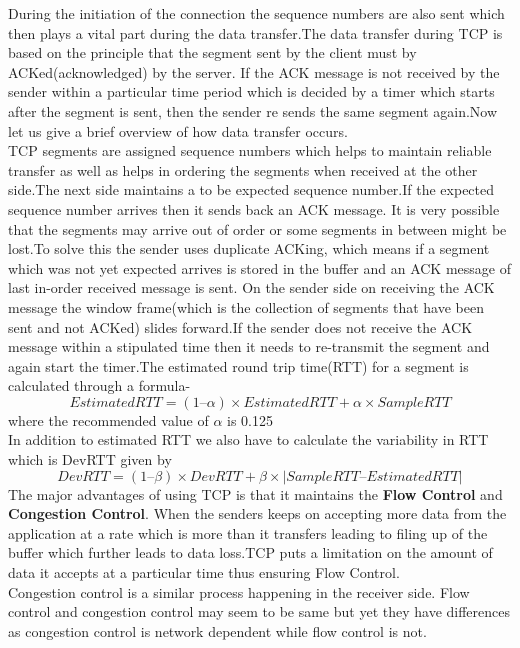 \documentclass{article}
\begin{document}
During the initiation of the connection the sequence numbers are also sent which then plays a vital part during the data transfer.The data transfer during TCP is based on the principle that the segment sent by the client must by ACKed(acknowledged) by the server. If the ACK message is not received by the sender within a particular time period which is decided by a timer which starts after the segment is sent, then the sender re sends the same segment again.Now let us give a brief overview of how data transfer occurs.\\
TCP segments are assigned sequence numbers which helps to maintain reliable transfer as well as helps in ordering the segments when received at the other side.The next side maintains a to be expected sequence number.If the expected sequence number arrives then it sends back an ACK message. It is very possible that the segments may arrive out of order or some segments in between might be lost.To solve this the sender uses duplicate ACKing, which means if a segment which was not yet expected arrives is stored in the buffer and an ACK message of last in-order received message is sent. On the sender side on receiving the ACK message the window frame(which is the collection of segments that have been sent and not ACKed) slides forward.If the sender does not receive the ACK message within a stipulated time then it needs to re-transmit the segment and again start the timer.The estimated round trip time(RTT) for a segment is calculated through a formula-
\[
    EstimatedRTT = (1 – \alpha) \times EstimatedRTT + \alpha \times SampleRTT
\]
where the recommended value of  $\alpha$ is 0.125\\
In addition to estimated RTT we also  have to calculate the variability in RTT which is DevRTT given by
\[
DevRTT = (1 – \beta) \times DevRTT + \beta \times | SampleRTT – EstimatedRTT |
\]
The major advantages of using TCP is that it maintains the \textbf{Flow Control} and \textbf{Congestion Control}. When the senders keeps on accepting more data from the application at a rate which is more than it transfers leading to filing up of the buffer which further leads to data loss.TCP puts a limitation on the amount of data it accepts at a particular time thus ensuring Flow Control.\\
Congestion control is a similar process happening in the receiver side. Flow control and congestion control may seem to be same but yet they have differences as congestion control is network dependent while flow control is not.
\end{document}
